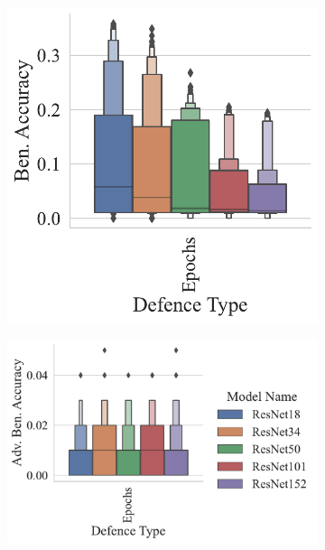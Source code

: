 \begin{figure}[h!]
\begin{subfigure}[]{0.27\textwidth}
    \centering
    \includegraphics[width=\textwidth]{cifar100/ben_accuracy_vs_defence_type.pdf}
\end{subfigure}
\begin{subfigure}[]{0.27\textwidth}
    \centering
    \includegraphics[width=\textwidth]{cifar100/adv_accuracy_vs_defence_type.pdf}
\end{subfigure}
\begin{subfigure}[]{0.36\textwidth}

\end{subfigure}
\end{figure}
